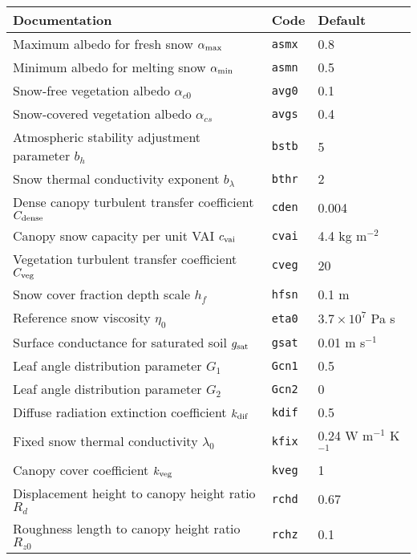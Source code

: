 \documentclass{article}
\begin{document}
\vskip20pt
\begin{tabular}{|l|l|l|}
\hline
Documentation                                      & Code       & Default                \\
\hline
Maximum albedo for fresh snow $\alpha_{\rm max}$   & {\tt asmx} & 0.8                    \\
Minimum albedo for melting snow $\alpha_{\rm min}$ & {\tt asmn} & 0.5                    \\
Snow-free vegetation albedo $\alpha_{c0}$          & {\tt avg0} & 0.1                    \\
Snow-covered vegetation albedo $\alpha_{cs}$       & {\tt avgs} & 0.4                    \\ 
Atmospheric stability adjustment parameter $b_h$   & {\tt bstb} & 5                      \\
Snow thermal conductivity exponent $b_\lambda$     & {\tt bthr} & 2                      \\
Dense canopy turbulent transfer coefficient $C_{\rm dense}$ & {\tt cden} & 0.004         \\
Canopy snow capacity per unit VAI $c_{\rm vai}$    & {\tt cvai} & 4.4 kg m$^{-2}$        \\
Vegetation turbulent transfer coefficient $C_{\rm veg}$ & {\tt cveg} & 20                \\
Snow cover fraction depth scale $h_f$ & {\tt hfsn} & 0.1 m                               \\
Reference snow viscosity $\eta_0$                  & {\tt eta0} & $3.7 \times 10^7$ Pa s \\
Surface conductance for saturated soil $g_{\rm sat}$ & {\tt gsat} & 0.01 m s$^{-1}$      \\
Leaf angle distribution parameter $G_1$            & {\tt Gcn1}   & 0.5                  \\
Leaf angle distribution parameter $G_2$            & {\tt Gcn2}   & 0                    \\
Diffuse radiation extinction coefficient $k_{\rm dif}$ & {\tt kdif} &  0.5               \\
Fixed snow thermal conductivity $\lambda_0$        & {\tt kfix} & 0.24 W m$^{-1}$ K$^{-1}$ \\
Canopy cover coefficient $k_{\rm veg}$             & {\tt kveg}   &  1 \\
Displacement height to canopy height ratio $R_d$   & {\tt rchd}   & 0.67 \\
Roughness length to canopy height ratio $R_{z0}$   & {\tt rchz}   & 0.1 \\

\end{tabular}
\end{document}
